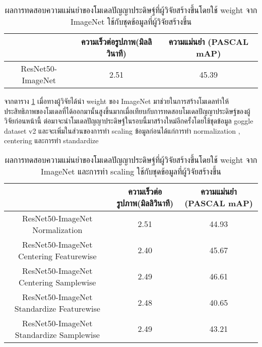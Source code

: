 \begin{table}[!ht]
	\centering
	\begin{tabular}{|c|c|c|}
			\hline
			{}&{ความเร็วต่อรูปภาพ(มิลลิวินาที)}&{ความแม่นยำ (PASCAL mAP)}			\\
			\hline
			ResNet50-ImageNet			& 2.51			& 45.39				\\
			\hline
	\end{tabular}
\caption{ผลการทดสอบความแม่นยำของโมเดลปัญญาประดิษฐ์ที่ผู้วิจัยสร้างขึ้นโดยใช้ weight จาก ImageNet ใช้กับชุดข้อมูลที่ผู้วิจัยสร้างขึ้น}
\label{tab: Test PASCAL mAP of dataset created by the researcher and pretrain weight imagenet}
\end{table}
จากตาราง \ref{tab: Test PASCAL mAP of dataset created by the researcher and pretrain weight imagenet} เมื่อทางผู้วิจัยได้นำ weight ของ ImageNet มาช่วยในการสร้างโมเดลทำให้ประสิทธิภาพของโมเดลที่ได้ออกมานั้นสูงขึ้นมากเมื่อเทียบกับการทดสอบโมเดลปัญญาประดิษฐ์ของผู้วิจัยก่อนหน้านี้ ต่อมาจะนำโมเดลปัญญาประดิษฐ์ในรอบนี้มาสร้างใหม่อีกครั้งโดยใช้ชุดข้อมูล goggle dataset v2 และจะเพิ่มในส่วนของการทำ scaling ข้อมูลก่อนได้แก่การทำ normalization , centering และการทำ standardize

\begin{table}[!ht]
	\centering
	\begin{tabular}{|c|c|c|}
			\hline
			{}&{ความเร็วต่อรูปภาพ(มิลลิวินาที)}&{ความแม่นยำ (PASCAL mAP)}			\\
			\hline
			ResNet50-ImageNet	 Normalization				& 2.51			& 44.93				\\
			ResNet50-ImageNet	 Centering Featurewise		& 2.40			& 45.67				\\
			ResNet50-ImageNet	 Centering Samplewise		& 2.49			& 46.61				\\
			ResNet50-ImageNet	 Standardize Featurewise		& 2.48			& 40.65				\\
			ResNet50-ImageNet	 Standardize Samplewise		& 2.49			& 43.21				\\
			\hline
	\end{tabular}
\caption{ผลการทดสอบความแม่นยำของโมเดลปัญญาประดิษฐ์ที่ผู้วิจัยสร้างขึ้นโดยใช้ weight จาก ImageNet และการทำ scaling ใช้กับชุดข้อมูลที่ผู้วิจัยสร้างขึ้น}
\label{tab: Test PASCAL mAP of dataset created by the researcher with pretrain weight imagenet and scaling}
\end{table}

